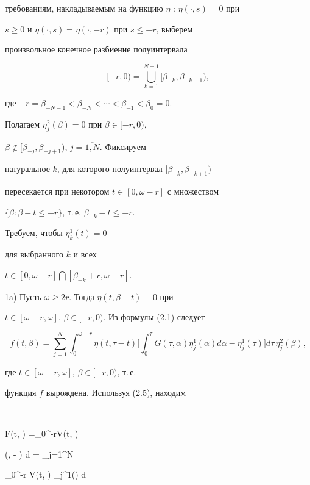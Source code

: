 требованиям, накладываемым на функцию $ \eta$ : $ \eta(\cdot,s) =0$ при


$s \geq 0$ и $ \eta(\cdot,s) = \eta(\cdot,-r)$ при $s \leq -r$, выберем


произвольное конечное разбиение полуинтервала


$$


[-r,0) =\bigcup_{k=1}^{N+1}


[\beta_{-k}, \beta_{-k+1}),


$$


где $-r= \beta_{-N-1} < \beta_{-N} <\dotsb< \beta_{-1} < \beta_{0} =0$.


Полагаем $ \eta_{j}^{2}(\beta) =0$ при $ \beta \in[-r,0)$,


$ \beta \notin[\beta_{-j}, \beta_{-j+1})$, $j= \overline{1,N}$. Фиксируем


натуральное $k$, для которого полуинтервал $[\beta_{-k}, \beta_{-k+1})$


пересекается при некотором $t \in[0, \omega-r]$ с множеством


$ \{\beta : \beta-t \leq -r \}$, т.\,е. $ \beta_{-k} -t \leq -r$.


Требуем, чтобы $ \eta_{k}^{1}(t) =0$


для выбранного $k$ и всех


$t \in[0, \omega-r] \bigcap[\beta_{-k} +r, \omega-r]$.





1a) Пусть $ \omega \geq 2r$. Тогда $ \eta(t, \beta-t) \equiv 0$ при


$t \in[\omega-r, \omega]$, $ \beta \in[-r,0)$. Из формулы (2.1) следует


$$


f(t, \beta) = \sum_{j=1}^{N} \int_{0}^{\omega-r}


\eta(t, \tau-t)\bigg[\int_{0}^{\tau}G(\tau, \alpha) \eta_{j}^{1}(\alpha)


d \alpha - \eta_{j}^{1}(\tau)\bigg] d \tau\, \eta_{j}^{2}(\beta),


$$


где $ t \in[\omega-r, \omega]$, $\beta \in[-r,0)$, т.\,е.


функция $f$ вырождена. Используя (2.5), находим


$$


F(t, \beta) =\int_{0}^{\omega-r}V(t, \alpha)


\eta(\alpha, \beta- \alpha) d \alpha= \sum_{j=1}^{N}


\int_{0}^{\omega-r} V(t, \alpha) \eta_{j}^{1}(\alpha) d \alpha\,


